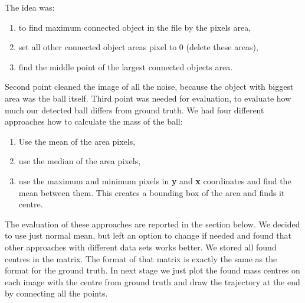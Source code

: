 \documentclass[10pt,a4paper,oneclumn]{article}
\begin{document}
The idea was: 
\begin{enumerate}
\item to find maximum connected object in the file by the pixels area, 
\item set all other connected object areas pixel to 0 (delete these areas), 
\item find the middle point of the largest connected objects area. 
\end{enumerate}

Second point cleaned the image of all the noise, because the object with biggest area was the ball itself. Third point was needed for evaluation, to evaluate how much our detected ball differs from ground truth. We had four different approaches how to calculate the mass of the ball:

\begin{enumerate}
\item Use the mean of the area pixels,
\item use the median of the area pixels,
\item use the maximum and minimum pixels in \textbf{y} and \textbf{x} coordinates and find the mean between them. This creates a bounding box of the area and finds it centre.
\end{enumerate}

The evaluation of these approaches are reported in the section below. We decided to use just normal mean, but left an option to change if needed and found that other approaches with different data sets works better. We stored all found centres in the matrix. The format of that matrix is exactly the same as the format for the ground truth. In next stage we just plot the found mass centres on each image with the centre from ground truth and draw the trajectory at the end by connecting all the points.
\end{document}
